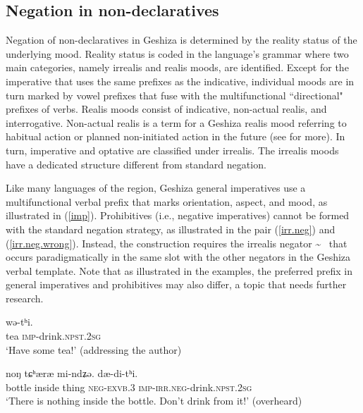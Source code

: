 \documentclass[output=paper,colorlinks,citecolor=brown]{langscibook}
\begin{document}
\subsection{Negation in non-declaratives}
Negation of non-declaratives in Geshiza is determined by the reality status of the underlying mood. Reality status is coded in the language's grammar where two main categories, namely irrealis and realis moods, are identified. Except for the imperative that uses the same prefixes as the indicative, individual moods are in turn marked by vowel prefixes that fuse with the multifunctional ``directional" prefixes of verbs. Realis moods consist of indicative, non-actual realis, and interrogative. Non-actual realis is a term for a Geshiza realis mood referring to habitual action or planned non-initiated action in the future (see \citealt[563--564]{Honkasalo2019} for more). In turn, imperative and optative are classified under irrealis. The irrealis moods have a dedicated structure different from standard negation.

Like many languages of the region, Geshiza general imperatives use a multifunctional verbal prefix that marks orientation, aspect, and mood, as illustrated in (\ref{imp}). Prohibitives (i.e., negative imperatives) cannot be formed with the standard negation strategy, as illustrated in the pair  (\ref{irr.neg}) and (\ref{irr.neg.wrong}). Instead, the construction requires the irrealis negator  \textasciitilde \  that occurs paradigmatically in the same slot with the other negators in the Geshiza verbal template. Note that as illustrated in the examples, the preferred prefix in general imperatives and prohibitives may also differ, a topic that needs further research.

\ea
\label{imp}
    {wə-tʰi.}\\  
    tea  \textsc{imp}-drink.\textsc{npst.2sg}\\ 
\glt `Have some tea!' (addressing the author)
\z

\ea
\label{irr.neg}
    {noŋ}    {tɕʰæræ}	{mi-ndʑə.}    {dæ-di-tʰi.}\\  
     bottle     inside  thing   \textsc{neg-exvb}.3 \textsc{imp}-\textsc{irr.neg}-drink.\textsc{npst.2sg}\\ 
\glt `There is nothing inside the bottle. Don't drink from it!' (overheard)
\z

\z
\end{document}
